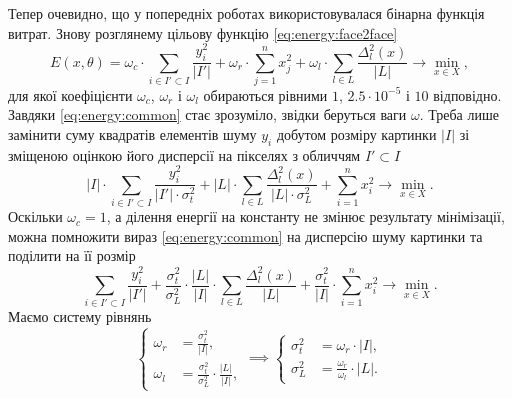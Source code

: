 Тепер очевидно,
що у попередніх роботах використовувалася бінарна функція витрат.
Знову розглянему цільову функцію \eqref{eq:energy:face2face}
\begin{equation*}
  E\left( x, \theta \right)
  = \omega_c \cdot \sum_{i \in I' \subset I} \frac{y_i^2}{\left| I' \right|}
  + \omega_r \cdot \sum_{j = 1}^{n} x_j^2
  + \omega_l \cdot \sum_{l \in L} \frac{\Delta_l^2\left( x \right)}
                                       {\left| L \right|}
  \to \min\limits_{x \in X},
\end{equation*}
для якої коефіцієнти $\omega_c$, $\omega_r$ і $\omega_l$
обираються рівними $1$, $2.5 \cdot 10^{-5}$ і $10$ відповідно.
Завдяки \eqref{eq:energy:common} стає зрозуміло,
звідки беруться ваги $\omega$.
Треба лише замінити суму квадратів елементів шуму $y_i$
добутом розміру картинки $\left| I \right|$ зі
зміщеною оцінкою його дисперсії на пікселях з обличчям $I' \subset I$
\begin{equation*}
  \left| I \right| \cdot
    \sum_{i \in I' \subset I} \frac{y_i^2}{\left| I' \right| \cdot \sigma^2_t}
  + \left| L \right| \cdot
    \sum_{l \in L} \frac{\Delta_l^2\left( x \right)}
                        {\left| L \right| \cdot \sigma_L^2}
  + \sum_{i = 1}^n x_i^2
  \to \min\limits_{x \in X}.
\end{equation*}
Оскільки $\omega_c = 1$,
а ділення енергії на константу не змінює результату мінімізації,
можна помножити вираз \eqref{eq:energy:common}
на дисперсію шуму картинки та поділити на її розмір
\begin{equation*}
  \sum_{i \in I' \subset I} \frac{y_i^2}{\left| I' \right|}
  + \frac{\sigma^2_t}{\sigma_L^2} \cdot \frac{\left| L \right|}{\left| I \right|}
    \cdot \sum_{l \in L} \frac{\Delta_l^2\left( x \right)}{\left| L \right|}
  + \frac{\sigma^2_t}{\left| I \right|} \cdot \sum_{i = 1}^n x_i^2
  \to \min\limits_{x \in X}.
\end{equation*}
Маємо систему рівнянь
\begin{equation*}
  \begin{cases}
    \omega_r &= \frac{\sigma^2_t}{\left| I \right|}, \\
    \omega_l &= \frac{\sigma^2_t}{\sigma_L^2}
                \cdot \frac{\left| L \right|}{\left| I \right|},
  \end{cases}
  \implies
  \begin{cases}
    \sigma^2_t &= \omega_r \cdot \left| I \right|, \\
    \sigma_L^2 &= \frac{\omega_r}{\omega_l} \cdot \left| L \right|.
  \end{cases}
\end{equation*}
